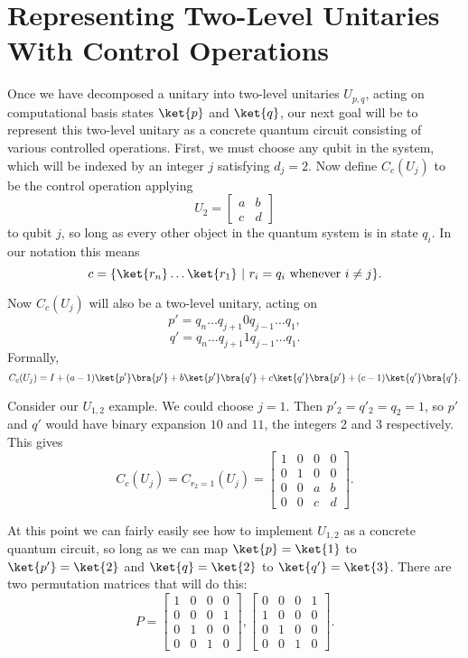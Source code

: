 \section{Representing Two-Level Unitaries With Control Operations}
Once we have decomposed a unitary into two-level unitaries $U_{p,q}$, acting on computational basis states $\ket{p}$ and $\ket{q}$, our next goal will be to represent this two-level unitary as a concrete quantum circuit consisting of various controlled operations. First, we must choose any qubit in the system, which will be indexed by an integer $j$ satisfying $d_j = 2$. Now define $C_c(U_j)$ to be the control operation applying 
\[U_2 = \begin{bmatrix}
a & b \\
c & d
\end{bmatrix}\]
to qubit $j$, so long as every other object in the quantum system is in state $q_i$. In our notation this means
\[c = \{\ket{r_n}\dots\ket{r_1}\ |\ r_i = q_i \text{\ whenever\ } i \neq j\}.\]

Now $C_c(U_j)$ will also be a two-level unitary, acting on
\[p' = q_n \dots q_{j+1} 0 q_{j-1} \dots q_1,\]
\[q' = q_n \dots q_{j+1} 1 q_{j-1} \dots q_1.\]
Formally,
\[C_c(U_j) = I + (a-1)\ket{p'}\bra{p'} + b\ket{p'}\bra{q'}+ c\ket{q'}\bra{p'}+ (c-1)\ket{q'}\bra{q'}.\]

Consider our $U_{1,2}$ example. We could choose $j = 1$. Then $p'_2 = q'_2 = q_2 = 1$, so $p'$ and $q'$ would have binary expansion $10$ and $11$, the integers 2 and 3 respectively. This gives
\[C_c(U_j) = C_{r_2=1}(U_j) = \begin{bmatrix}
	1 & 0 & 0 & 0 \\
	0 & 1 & 0 & 0 \\
	0 & 0 & a & b \\
	0 & 0 & c & d
\end{bmatrix}.
\]

At this point we can fairly easily see how to implement $U_{1,2}$ as a concrete quantum circuit, so long as we can map $\ket{p}=\ket{1}$ to $\ket{p'} = \ket{2}$ and $\ket{q}=\ket{2}$ to $\ket{q'}=\ket{3}$. There are two permutation matrices that will do this:
\[P = \begin{bmatrix}
	1 & 0 & 0 & 0 \\
	0 & 0 & 0 & 1 \\
	0 & 1 & 0 & 0 \\
	0 & 0 & 1 & 0
\end{bmatrix}, \begin{bmatrix}
	0 & 0 & 0 & 1 \\
	1 & 0 & 0 & 0 \\
	0 & 1 & 0 & 0 \\
	0 & 0 & 1 & 0
\end{bmatrix}.\]

